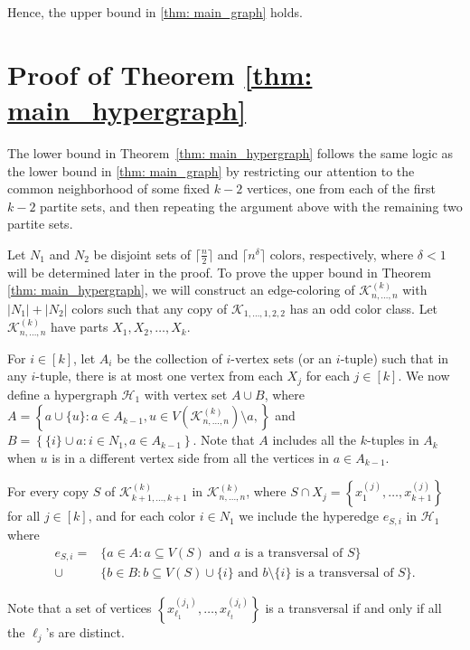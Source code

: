 \documentclass{article}
\theoremstyle{definition}
\newcommand\cK{{\mathcal K}}
\begin{document}
Hence, the upper bound in \cref{thm: main_graph} holds.


\section{Proof of Theorem \ref{thm: main_hypergraph}}\label{sec:hyp}

The lower bound in Theorem~\ref{thm: main_hypergraph} follows the same logic as the lower bound in \cref{thm: main_graph} by restricting our attention to the common neighborhood of some fixed $k-2$ vertices, one from each of the first $k-2$ partite sets, and then repeating the argument above with the remaining two partite sets.

Let $N_1$ and $N_2$ be disjoint sets of $\lceil \frac{n}{2}\rceil$ and $\lceil n^\delta \rceil$ colors, respectively,  where $\delta<1$ will be determined later in the proof. To prove the upper bound in Theorem \ref{thm: main_hypergraph}, we will construct an edge-coloring of $\cK_{n, \dots ,n}^{(k)}$ with $|N_1|+|N_2|$ colors such that any copy of $\cK_{1,\dots,1,2,2}$ has an odd color class. Let $\cK_{n,\dots, n}^{(k)}$ have parts $X_1, X_2, \dots, X_k$.  




For $i\in [k]$, let $A_i$ be the collection of $i$-vertex sets (or an $i$-tuple) such that in any $i$-tuple, there is at most one vertex from each $X_j$ for each $j\in [k]$. We now define a hypergraph $\mathcal{H}_1$ with vertex set $A\cup B$, where $A = \left\{a \cup \{u\}: a\in A_{k-1}, u\in V(\cK_{n, \dots ,n}^{(k)})\setminus a, \right\}$ and $B = \left\{\{i\} \cup a : i\in N_1, a\in A_{k-1} \right\}$. Note that $A$ includes all the $k$-tuples in $A_k$ when $u$ is in a different vertex side from all the vertices in $a\in A_{k-1}$.

For every copy $S$ of $\cK_{k+1,\dots,k+1}^{(k)}$ in $\cK_{n,\dots,n}^{(k)}$, where $S\cap X_j = \left\{x_1^{(j)},\dots,x_{k+1}^{(j)}\right\}$ for all $j\in [k]$, and for each color $i\in N_1$ we include the hyperedge $e_{S,i}$ in $\mathcal{H}_1$ where 
\begin{align*}
    e_{S,i} = &\{a\in A : \text{$a \subseteq V(S)$ and $a$ is a transversal of $S$}\} \\
    \cup &\{b\in B: b\subseteq V(S)\cup \{i\} \text{ and $b\setminus \{i\}$ is a transversal of $S$}\}.
\end{align*}

Note that a set of vertices $\left\{x^{(j_1)}_{\ell_1},\dots,x^{(j_t)}_{\ell_t} \right\}$ is a transversal if and only if all the $\ell_j$'s are distinct. 
\end{document}
